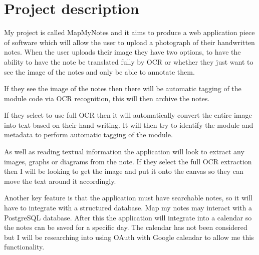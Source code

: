 \documentclass[11pt,fleqn,twoside]{article}
\begin{document}
\wordcount{}

\mmp

\setcounter{tocdepth}{3} %


\section{Project description}
My project is called MapMyNotes and it aims to produce a web application piece of software which will allow the user to upload a photograph of their handwritten notes. When the user uploads their image they have two options, to have the ability to have the note be translated fully by OCR or whether they just want to see the image of the notes and only be able to annotate them.

If they see the image of the notes then there will be automatic tagging of the module code via OCR recognition, this will then archive the notes.

If they select to use full OCR then it will automatically convert the entire image into text based on their hand writing. It will then try to identify the module and metadata to perform automatic tagging of the module.

As well as reading textual information the application will look to extract any images, graphs or diagrams from the note. If they select the full OCR extraction then I will be looking to get the image and put it onto the canvas so they can move the text around it accordingly.

Another key feature is that the application must have searchable notes, so it will have to integrate with a structured database. Map my notes may interact with a PostgreSQL database. After this the application will integrate into a calendar so the notes can be saved for a specific day. The calendar has not been considered but I will be researching into using OAuth with Google calendar to allow me this functionality.
\end{document}
